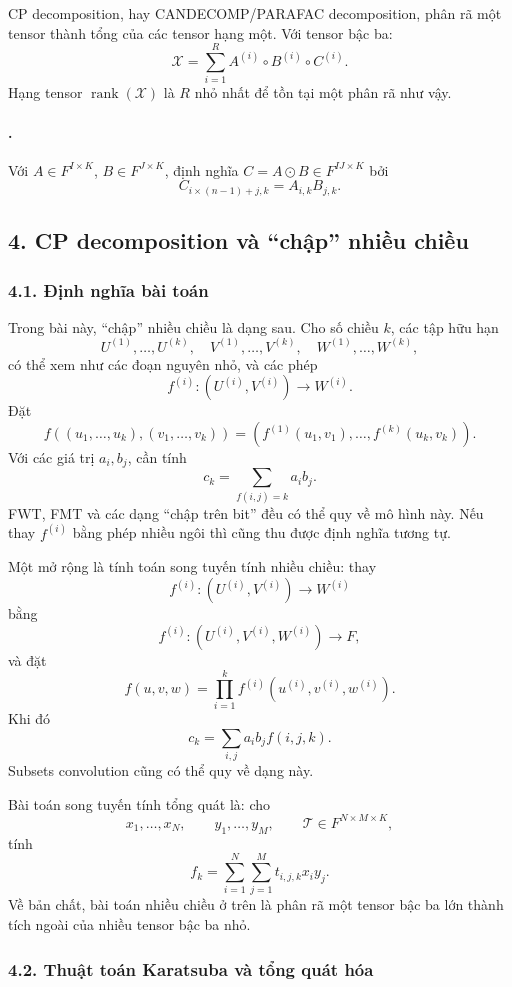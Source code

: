 \documentclass[11pt]{article}
\begin{document}
CP decomposition, hay CANDECOMP/PARAFAC decomposition, phân rã một tensor thành
tổng của các tensor hạng một. Với tensor bậc ba:
\[
  \mathcal X=\sum_{i=1}^{R}A^{(i)}\circ B^{(i)}\circ C^{(i)}.
\]
Hạng tensor \(\operatorname{rank}(\mathcal X)\) là \(R\) nhỏ nhất để tồn tại
một phân rã như vậy.

\paragraph{.}
Với \(A\in F^{I\times K}\), \(B\in F^{J\times K}\), định nghĩa
\(C=A\odot B\in F^{IJ\times K}\) bởi
\[
  C_{i\times (n-1)+j,k}=A_{i,k}B_{j,k}.
\]

\subsection*{4. CP decomposition và ``chập'' nhiều chiều}

\subsubsection*{4.1. Định nghĩa bài toán}

Trong bài này, ``chập'' nhiều chiều là dạng sau. Cho số chiều \(k\), các tập
hữu hạn
\[
  U^{(1)},\ldots,U^{(k)},\quad
  V^{(1)},\ldots,V^{(k)},\quad
  W^{(1)},\ldots,W^{(k)},
\]
có thể xem như các đoạn nguyên nhỏ, và các phép
\[
  f^{(i)}:(U^{(i)},V^{(i)})\to W^{(i)}.
\]
Đặt
\[
  f((u_1,\ldots,u_k),(v_1,\ldots,v_k))
  =
  (f^{(1)}(u_1,v_1),\ldots,f^{(k)}(u_k,v_k)).
\]
Với các giá trị \(a_i,b_j\), cần tính
\[
  c_k=\sum_{f(i,j)=k}a_i b_j.
\]
FWT, FMT và các dạng ``chập trên bit'' đều có thể quy về mô hình này. Nếu
thay \(f^{(i)}\) bằng phép nhiều ngôi thì cũng thu được định nghĩa tương tự.

Một mở rộng là tính toán song tuyến tính nhiều chiều: thay
\[
  f^{(i)}:(U^{(i)},V^{(i)})\to W^{(i)}
\]
bằng
\[
  f^{(i)}:(U^{(i)},V^{(i)},W^{(i)})\to F,
\]
và đặt
\[
  f(u,v,w)=\prod_{i=1}^{k}f^{(i)}(u^{(i)},v^{(i)},w^{(i)}).
\]
Khi đó
\[
  c_k=\sum_{i,j}a_i b_j f(i,j,k).
\]
Subsets convolution cũng có thể quy về dạng này.

Bài toán song tuyến tính tổng quát là: cho
\[
  x_1,\ldots,x_N,\qquad y_1,\ldots,y_M,\qquad
  \mathcal T\in F^{N\times M\times K},
\]
tính
\[
  f_k=\sum_{i=1}^{N}\sum_{j=1}^{M}t_{i,j,k}x_i y_j.
\]
Về bản chất, bài toán nhiều chiều ở trên là phân rã một tensor bậc ba lớn
thành tích ngoài của nhiều tensor bậc ba nhỏ.

\subsubsection*{4.2. Thuật toán Karatsuba và tổng quát hóa}
\end{document}
